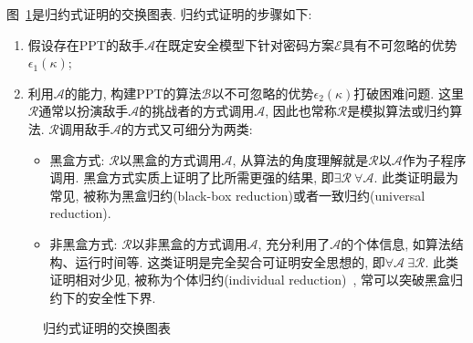 图~\ref{figure:reduction-proof}是归约式证明的交换图表. 归约式证明的步骤如下: 
\begin{enumerate}
\item 假设存在PPT的敌手$\mathcal{A}$在既定安全模型下针对密码方案$\mathcal{E}$具有不可忽略的优势$\epsilon_1(\kappa)$; 
\item 利用$\mathcal{A}$的能力, 构建PPT的算法$\mathcal{B}$以不可忽略的优势$\epsilon_2(\kappa)$打破困难问题. 
	这里$\mathcal{R}$通常以扮演敌手$\mathcal{A}$的挑战者的方式调用$\mathcal{A}$, 因此也常称$\mathcal{R}$是模拟算法或归约算法. 
	$\mathcal{R}$调用敌手$\mathcal{A}$的方式又可细分为两类: 
	\begin{itemize}
		\item 黑盒方式: $\mathcal{R}$以黑盒的方式调用$\mathcal{A}$, 从算法的角度理解就是$\mathcal{R}$以$\mathcal{A}$作为子程序调用. 
			黑盒方式实质上证明了比所需更强的结果, 即$\exists \mathcal{R} ~ \forall \mathcal{A}$. 
			此类证明最为常见, 被称为黑盒归约(black-box reduction)或者一致归约(universal reduction). 

		\item 非黑盒方式: $\mathcal{R}$以非黑盒的方式调用$\mathcal{A}$, 充分利用了$\mathcal{A}$的个体信息, 如算法结构、运行时间等. 
			这类证明是完全契合可证明安全思想的, 即$\forall \mathcal{A} ~ \exists \mathcal{R}$. 
			此类证明相对少见, 被称为个体归约(individual reduction)~\cite{Deng-EUROCRYPT-2017}, 常可以突破黑盒归约下的安全性下界.  
	\end{itemize}
\end{enumerate}

\begin{figure}[!hbtp]
\begin{center}
\end{center}
\caption{归约式证明的交换图表}\label{figure:reduction-proof}
\end{figure}

